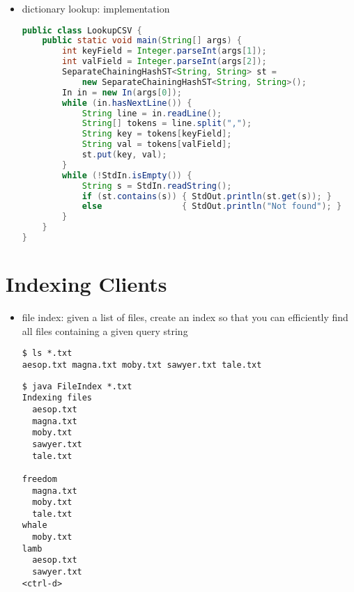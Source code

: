 \documentclass[8pt,a4paper,compress]{beamer}
\begin{document}
\begin{frame}[fragile]
\begin{itemize}
\item dictionary lookup: implementation
\begin{lstlisting}[language=Java]
public class LookupCSV {
    public static void main(String[] args) {
        int keyField = Integer.parseInt(args[1]);
        int valField = Integer.parseInt(args[2]);
        SeparateChainingHashST<String, String> st = 
            new SeparateChainingHashST<String, String>();
        In in = new In(args[0]);
        while (in.hasNextLine()) {
            String line = in.readLine();
            String[] tokens = line.split(",");
            String key = tokens[keyField];
            String val = tokens[valField];
            st.put(key, val);
        }
        while (!StdIn.isEmpty()) {
            String s = StdIn.readString();
            if (st.contains(s)) { StdOut.println(st.get(s)); }
            else                { StdOut.println("Not found"); }
        }
    }
}
\end{lstlisting}
\end{itemize}
\end{frame}

\section{Indexing Clients}
\begin{frame}[fragile]
\begin{itemize}
\item file index: given a list of files, create an index so that you can efficiently find all files containing a given query string

\begin{lstlisting}[language={}]
$ ls *.txt
aesop.txt magna.txt moby.txt sawyer.txt tale.txt 
\end{lstlisting}

\begin{lstlisting}[language={}]
$ java FileIndex *.txt
Indexing files
  aesop.txt 
  magna.txt 
  moby.txt 
  sawyer.txt 
  tale.txt 

freedom
  magna.txt 
  moby.txt 
  tale.txt
whale
  moby.txt
lamb
  aesop.txt
  sawyer.txt 
<ctrl-d>
\end{lstlisting}
\end{itemize}
\end{frame}
\end{document}
